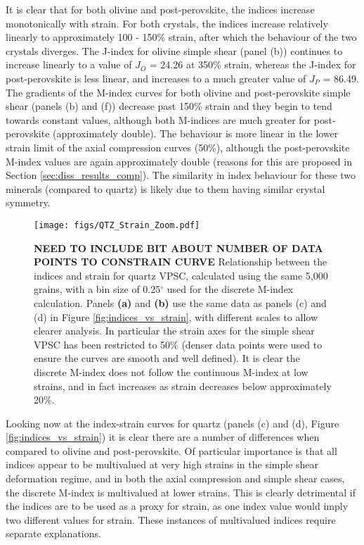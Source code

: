 \documentclass[a4paper,12pt,twoside]{report}
\numberwithin{equation}{chapter}
\begin{document}
It is clear that for both olivine and post-perovskite, the indices increase monotonically with strain. For both crystals, the indices increase relatively linearly to approximately 100 - 150\% strain, after which the behaviour of the two crystals diverges. The J-index for olivine simple shear (panel (b)) continues to increase linearly to a value of $J_O$ = 24.26 at 350\% strain, whereas the J-index for post-perovskite is less linear, and increases to a much greater value of $J_P$ = 86.49. The gradients of the M-index curves for both olivine and post-perovskite simple shear (panels (b) and (f)) decrease past 150\% strain and they begin to tend towards constant values, although both M-indices are much greater for post-perovskite (approximately double). The behaviour is more linear in the lower strain limit of the axial compression curves (50\%), although the post-perovskite M-index values are again approximately double (reasons for this are proposed in Section \ref{sec:diss_results_comp}). The similarity in index behaviour for these two minerals (compared to quartz) is likely due to them having similar crystal symmetry.

\begin{figure}[h]
  \centering
    \texttt{[image: figs/QTZ\_Strain\_Zoom.pdf]}
  \caption[Relation of indices to strain (quartz VPSC)]{\textbf{NEED TO INCLUDE BIT ABOUT NUMBER OF DATA POINTS TO CONSTRAIN CURVE} Relationship between the indices and strain for quartz VPSC, calculated using the same 5,000 grains, with a bin size of 0.25$^\circ$ used for the discrete M-index calculation. Panels \textbf{(a)} and \textbf{(b)} use the same data as panels (c) and (d) in Figure \ref{fig:indices_vs_strain}, with different scales to allow clearer analysis. In particular the strain axes for the simple shear VPSC has been restricted to 50\% (denser data points were used to ensure the curves are smooth and well defined). It is clear the discrete M-index does not follow the continuous M-index at low strains, and in fact increases as strain decreases below approximately 20\%.}
  \label{fig:indices_vs_strain_qtz}
\end{figure} 

Looking now at the index-strain curves for quartz (panels (c) and (d), Figure \ref{fig:indices_vs_strain}) it is clear there are a number of differences when compared to olivine and post-perovskite. Of particular importance is that all indices appear to be multivalued at very high strains in the simple shear deformation regime, and in both the axial compression and simple shear cases, the discrete M-index is multivalued at lower strains. This is clearly detrimental if the indices are to be used as a proxy for strain, as one index value would imply two different values for strain. These instances of multivalued indices require separate explanations.
\end{document}
